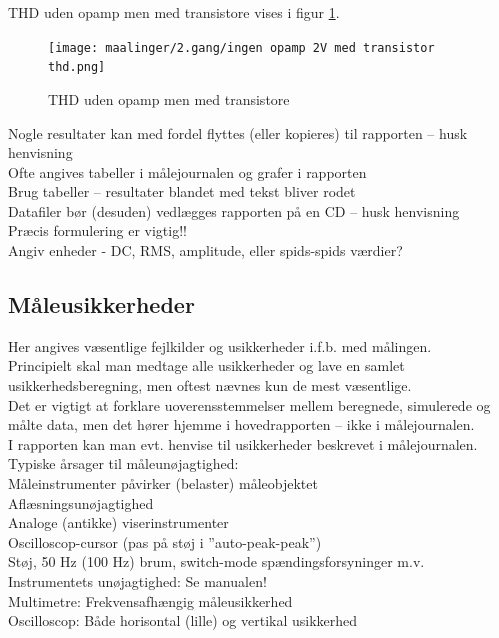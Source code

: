 THD uden opamp men med transistore vises i figur \ref{fig:apind:uopmt}.
\begin{figure}[h]
\centering
\texttt{[image: maalinger/2.gang/ingen opamp 2V med transistor thd.png]}
\caption{THD uden opamp men med transistore}
\label{fig:apind:uopmt}
\end{figure}



Nogle resultater kan med fordel flyttes (eller kopieres) til rapporten – husk henvisning \\
Ofte angives tabeller i målejournalen og grafer i rapporten \\
Brug tabeller – resultater blandet med tekst bliver rodet\\
Datafiler bør (desuden) vedlægges rapporten på en CD – husk henvisning\\
Præcis formulering er vigtig!!\\
Angiv enheder - DC, RMS, amplitude, eller spids-spids værdier?\\

\subsection*{Måleusikkerheder}
Her angives væsentlige fejlkilder og usikkerheder i.f.b. med målingen. \\
Principielt skal man medtage alle usikkerheder og lave en samlet usikkerhedsberegning, men oftest nævnes kun de mest væsentlige. \\
Det er vigtigt at forklare uoverensstemmelser mellem beregnede, simulerede og målte data, men det hører hjemme i hovedrapporten – ikke i målejournalen. \\
I rapporten kan man evt. henvise til usikkerheder beskrevet i målejournalen.\\
Typiske årsager til måleunøjagtighed:\\
Måleinstrumenter påvirker (belaster) måleobjektet\\
Aflæsningsunøjagtighed\\
Analoge (antikke) viserinstrumenter	\\
Oscilloscop-cursor (pas på støj i ”auto-peak-peak”)\\
Støj, 50 Hz (100 Hz) brum, switch-mode spændingsforsyninger m.v.\\
Instrumentets unøjagtighed: Se manualen! \\
Multimetre: Frekvensafhængig måleusikkerhed \\
Oscilloscop: Både horisontal (lille) og vertikal usikkerhed\\
%